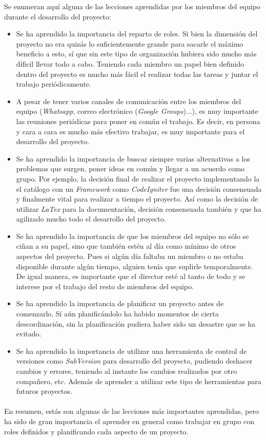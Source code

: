 Se enumeran aquí alguna de las lecciones aprendidas por los miembros del equipo durante el desarrollo del proyecto:
\begin{itemize}
	\item Se ha aprendido la importancia del reparto de roles. Si bien la dimensión del proyecto no era quizás lo suficientemente grande para sacarle el máximo beneficio a esto, sí que sin este tipo de organización hubiera sido mucho más díficil llevar todo a cabo. Teniendo cada miembro un papel bien definido dentro del proyecto es mucho más fácil el realizar todas las tareas y juntar el trabajo periódicamente.
	\item A pesar de tener varios canales de comunicación entre los miembros del equipo (\textit{Whatsapp}, correo electrónico (\textit{Google Groups})...), es muy importante las reuniones periódicas para poner en común el trabajo. Es decir, en persona y cara a cara es mucho más efectivo trabajar, es muy importante para el desarrollo del proyecto.
	\item Se ha aprendido la importancia de buscar siempre varias alternativas a los problemas que surgen, poner ideas en común y llegar a un acuerdo como grupo. Por ejemplo, la decisión final de realizar el proyecto implementando la el catálogo con un \textit{Framework} como \textit{CodeIgniter} fue una decisión consensuada y finalmente vital para realizar a tiempo el proyecto. Así como la decisión de utilizar \textit{LaTex} para la documentación, decisión consensuada también y que ha agilizado mucho todo el desarrollo del proyecto.
	\item Se ha aprendido la importancia de que los miembros del equipo no sólo se ciñan a su papel, sino que también estén al día como mínimo de otros aspectos del proyecto. Pues si algún día faltaba un miembro o no estaba disponible durante algún tiempo, alguien tenía que suplirle temporalmente. De igual manera, es importante que el director esté al tanto de todo y se interese por el trabajo del resto de miembros del equipo.
	\item Se ha aprendido la importancia de planificar un proyecto antes de comenzarlo. Sí aún planificándolo ha habido momentos de cierta descordinación, sin la planificación pudiera haber sido un desastre que se ha evitado.
	\item Se ha aprendido la importancia de utilizar una herramienta de control de versiones como \textit{SubVersion} para desarrollo del proyecto, pudiendo deshacer cambios y errores, teniendo al instante los cambios realizados por otro compañero, etc. Además de aprender a utilizar este tipo de herramientas para futuros proyectos.
\end{itemize}
\paragraph{}En resumen, estás son algunas de las lecciones más importantes aprendidas, pero ha sido de gran importancia el aprender en general como trabajar en grupo con roles definidos y planificando cada aspecto de un proyecto.